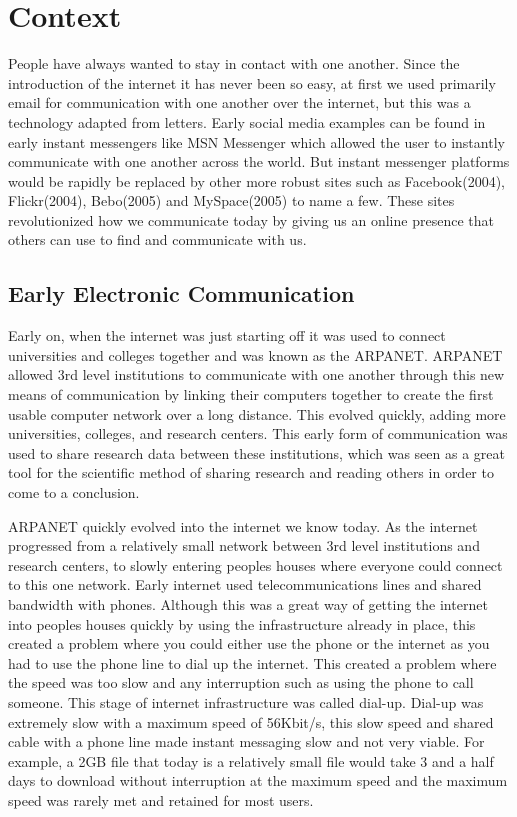 \chapter{Context} \label{context}
People have always wanted to stay in contact with one another. Since the introduction of the internet it has never been so easy, at first we used primarily email for communication with one another over the internet, but this was a technology adapted from letters. Early social media examples can be found in early instant messengers like MSN Messenger which allowed the user to instantly communicate with one another across the world. But instant messenger platforms would be rapidly be replaced by other more robust sites such as Facebook(2004), Flickr(2004), Bebo(2005) and MySpace(2005) to name a few. These sites revolutionized how we communicate today by giving us an online presence that others can use to find and communicate with us.

\section{Early Electronic Communication}
Early on, when the internet was just starting off it was used to connect universities and colleges together and was known as the ARPANET. ARPANET allowed 3rd level institutions to communicate with one another through this new means of communication by linking their computers together to create the first usable computer network over a long distance. This evolved quickly, adding more universities, colleges, and research centers. This early form of communication was used to share research data between these institutions, which was seen as a great tool for the scientific method of sharing research and reading others in order to come to a conclusion.

ARPANET quickly evolved into the internet we know today. As the internet progressed from a relatively small network between 3rd level institutions and research centers, to slowly entering peoples houses where everyone could connect to this one network. Early internet used telecommunications lines and shared bandwidth with phones. Although this was a great way of getting the internet into peoples houses quickly by using the infrastructure already in place, this created a problem where you could either use the phone or the internet as you had to use the phone line to dial up the internet. This created a problem where the speed was too slow and any interruption such as using the phone to call someone. This stage of internet infrastructure was called dial-up. Dial-up was extremely slow with a maximum speed of 56Kbit/s, this slow speed and shared cable with a phone line made instant messaging slow and not very viable. For example, a 2GB file that today is a relatively small file would take 3 and a half days to download without interruption at the maximum speed and the maximum speed was rarely met and retained for most users.

